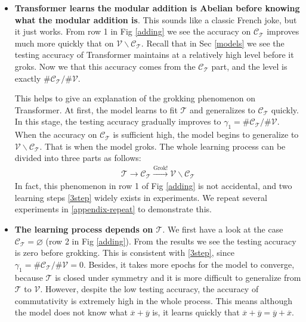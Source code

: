 \documentclass{article}
\begin{document}
\begin{itemize}
    \item \textbf{Transformer learns the modular addition is Abelian before knowing what the modular addition is}. This sounds like a classic French joke, but it just works. From row 1 in Fig \ref{adding} we see the accuracy on $\mathcal{C_T}$ improves much more quickly that on $\mathcal{V}\backslash\mathcal{C_T}$. Recall that in Sec \ref{models} we see the testing accuracy of Transformer maintains at a relatively high level before it groks. Now we that this accuracy comes from the $\mathcal{C_T}$ part, and the level is exactly $\#\mathcal{C_T} /\#\mathcal{V}$.

    This helps to give an explanation of the grokking phenomenon on Transformer. At first, the model learns to fit $\mathcal{T}$ and generalizes to $\mathcal{C_T}$ quickly. In this stage, the testing accuracy gradually improves to $\gamma_1 = \#\mathcal{C_T} /\#\mathcal{V}$. When the accuracy on $\mathcal{C_T}$ is sufficient high, the model begins to generalize to $\mathcal{V}\backslash\mathcal{C_T}$. That is when the model groks. The whole learning process can be divided into three parts as follows:
    \begin{align}
        \mathcal{T} \rightarrow \mathcal{C_T} \xrightarrow{\text{Grok!}} \mathcal{V}\backslash\mathcal{C_T}\label{3step}
    \end{align}
    In fact, this phenomenon in row 1 of Fig \ref{adding} is not accidental, and two learning steps \eqref{3step} widely exists in experiments. We repeat several experiments in \ref{appendix-repeat} to demonstrate this.

    \item \textbf{The learning process depends on $\mathcal{T}$}. We first have a look at the case $\mathcal{C_T} = \varnothing$ (row 2 in Fig \ref{adding}). From the results we see the testing accuracy is zero before grokking. This is consistent with \eqref{3step}, since $\gamma_1 = \#\mathcal{C_T} /\#\mathcal{V} = 0$. Besides, it takes more epochs for the model to converge, because $\mathcal{T}$ is closed under symmetry and it is more difficult to generalize from $\mathcal{T}$ to $\mathcal{V}$. However, despite the low testing accuracy, the accuracy of commutativity is extremely high in the whole process. This means although the model does not know what $\overline{x}+\overline{y}$ is, it learns quickly that $\overline{x}+\overline{y} = \overline{y}+\overline{x}$.
    

\end{itemize}
\end{document}
